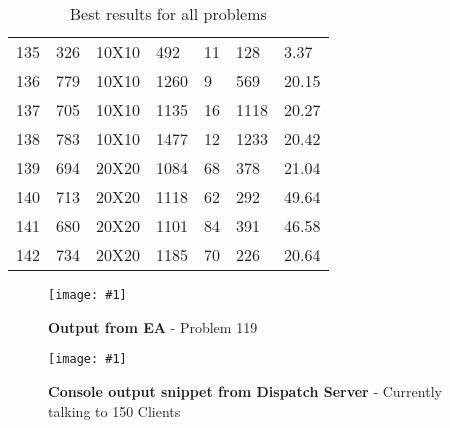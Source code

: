 \documentclass[14pt]{acmsiggraph}
\newcommand{\figuremacroF}[4]{
	\begin{figure*}[t] %
		\centering
		\texttt{[image: \#1]}
		\caption[#2]{\textbf{#2} - #3}
		\label{fig:#1}
	\end{figure*}
}
\begin{document}
\begin{table}[h!]
\begin{center}
{\begin{tabular}{||lllllll}
					135 & 326  & 10X10  & \cellcolor[rgb]{1,0.9,0.5}492       & 11  & 128  & 3.37  \\
					136 & 779  & 10X10  & \cellcolor[rgb]{1,0.7,0.39}1260     & 9   & 569  & 20.15 \\
					137 & 705  & 10X10  & \cellcolor[rgb]{1,0.72,0.4}1135     & 16  & 1118 & 20.27 \\
					138 & 783  & 10X10  & \cellcolor[rgb]{1,0.21,0.12}1477    & 12  & 1233 & 20.42 \\
					139 & 694  & 20X20  & \cellcolor[rgb]{1,0.8,0.45}1084     & 68  & 378  & 21.04 \\
					140 & 713  & 20X20  & \cellcolor[rgb]{1,0.8,0.45}1118     & 62  & 292  & 49.64 \\
					141 & 680  & 20X20  & \cellcolor[rgb]{1,0.7,0.39}1101     & 84  & 391  & 46.58 \\
					142 & 734  & 20X20  & \cellcolor[rgb]{1,0.71,0.4}1185     & 70  & 226  & 20.64 \\
				\end{tabular}\centering
			}
			
			\caption{Best results for all problems}
			\label{finalResults}
		\end{center}
		
	\end{table}
	
	\figuremacroF
	{genalgrunning}
	{Output from EA}
	{Problem 119}
	{1.0}
	\figuremacroF
	{dispatchcmd}
	{Console output snippet from Dispatch Server}
	{Currently talking to 150 Clients}
	{1.0}
	
\end{document}
